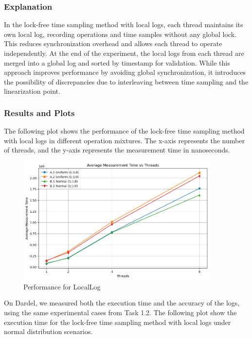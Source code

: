\documentclass{article}
\begin{document}
\subsubsection{Explanation}
In the lock-free time sampling method with local logs, each thread maintains its own local log, recording operations and time samples without any global lock. This reduces synchronization overhead and allows each thread to operate independently. At the end of the experiment, the local logs from each thread are merged into a global log and sorted by timestamp for validation. While this approach improves performance by avoiding global synchronization, it introduces the possibility of discrepancies due to interleaving between time sampling and the linearization point.

\subsubsection{Results and Plots}

The following plot shows the performance of the lock-free time sampling method with local logs in different operation mixtures. The x-axis represents the number of threads, and the y-axis represents the measurement time in nanoseconds.


\begin{figure}[H]
    \centering
    \includegraphics[width=0.9\textwidth]{LaTex/images/Lab 3 2.4.2.1.png}
    \caption{Performance for LocalLog}
    \label{fig:performance_a1}
\end{figure}


On Dardel, we measured both the execution time and the accuracy of the logs, using the same experimental cases from Task 1.2. The following plot show the execution time for the lock-free time sampling method with local logs under normal distribution scenarios.
\end{document}
